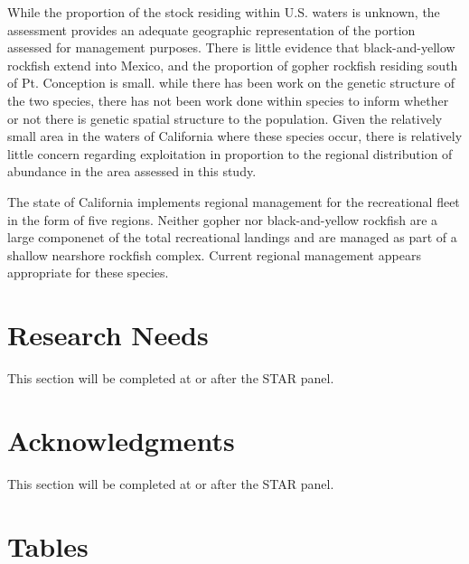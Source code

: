\documentclass[12pt,]{article}
\begin{document}
While the proportion of the stock residing within U.S. waters is
unknown, the assessment provides an adequate geographic representation
of the portion assessed for management purposes. There is little
evidence that black-and-yellow rockfish extend into Mexico, and the
proportion of gopher rockfish residing south of Pt. Conception is small.
while there has been work on the genetic structure of the two species,
there has not been work done within species to inform whether or not
there is genetic spatial structure to the population. Given the
relatively small area in the waters of California where these species
occur, there is relatively little concern regarding exploitation in
proportion to the regional distribution of abundance in the area
assessed in this study.

The state of California implements regional management for the
recreational fleet in the form of five regions. Neither gopher nor
black-and-yellow rockfish are a large componenet of the total
recreational landings and are managed as part of a shallow nearshore
rockfish complex. Current regional management appears appropriate for
these species.

\section{Research Needs}\label{research-needs}

This section will be completed at or after the STAR panel.

\section{Acknowledgments}\label{acknowledgments}

This section will be completed at or after the STAR panel.

\newpage

\FloatBarrier

\section{Tables}\label{tables}

\FloatBarrier
\end{document}
